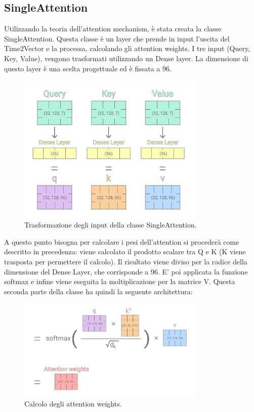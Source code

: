 \documentclass[12pt,a4paper,twoside,openright]{book}
\begin{document}
\subsection{SingleAttention}

Utilizzando la teoria dell’attention mechanism, è stata creata la classe SingleAttention. Questa classe è un layer che prende in input l’uscita del Time2Vector e la processa, calcolando gli attention weights.
I tre input (Query, Key, Value), vengono trasformati utilizzando un Dense layer. La dimensione di questo layer è una scelta progettuale ed è fissata a 96.

\begin{figure}[H]
\centering
\includegraphics[width=0.8\textwidth]{images/singlehead.png}
\caption{Trasformazione degli input della classe SingleAttention.}
\label{fig:rapp_file}
\end{figure}

A questo punto bisogna per calcolare i pesi dell’attention si procederà come descritto in precedenza: viene calcolato il prodotto scalare tra Q e K (K viene trasposta per permettere il calcolo). Il risultato viene diviso per la radice della dimensione del Dense Layer, che corrisponde a 96. E' poi applicata la funzione softmax e infine viene eseguita la moltiplicazione per la matrice V.
Questa seconda parte della classe ha quindi la seguente architettura:

\begin{figure}[H]
\centering
\includegraphics[width=0.8\textwidth]{images/single2.png}
\caption{Calcolo degli attention weights.}
\label{fig:rapp_file}
\end{figure}
\end{document}
